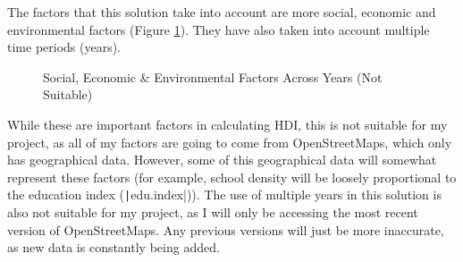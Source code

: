 \documentclass[12pt]{report}
\newcommand{\pil}[1]{\protect\texttt|#1|}
\begin{document}
The factors that this solution take into account are more social, economic and environmental factors (Figure \ref{fig:es2b}). They have also taken into account multiple time periods (years).
\begin{figure}[H]
\centering
{}
\caption{Social, Economic \& Environmental Factors Across Years (Not Suitable)}\label{fig:es2b}
\end{figure}
While these are important factors in calculating HDI, this is not suitable for my project, as all of my factors are going to come from OpenStreetMaps, which only has geographical data. However, some of this geographical data will somewhat represent these factors (for example, school density will be loosely proportional to the education index (\pil{edu.index})). The use of multiple years in this solution is also not suitable for my project, as I will only be accessing the most recent version of OpenStreetMaps. Any previous versions will just be more inaccurate, as new data is constantly being added.
\end{document}
